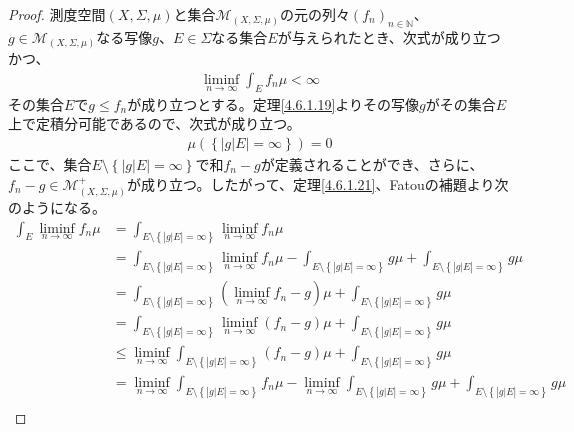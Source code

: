 \documentclass[dvipdfmx]{jsarticle}
\begin{document}
\begin{proof}
測度空間$(X,\varSigma,\mu)$と集合$\mathcal{M}_{(X,\varSigma,\mu)}$の元の列々$\left( f_{n} \right)_{n \in \mathbb{N}}$、$g \in \mathcal{M}_{(X,\varSigma,\mu)}$なる写像$g$、$E \in \varSigma$なる集合$E$が与えられたとき、次式が成り立つかつ、
\begin{align*}
\liminf_{n \rightarrow \infty}{\int_{E} {f_{n}\mu}} < \infty
\end{align*}
その集合$E$で$g \leq f_{n}$が成り立つとする。定理\ref{4.6.1.19}よりその写像$g$がその集合$E$上で定積分可能であるので、次式が成り立つ。
\begin{align*}
\mu\left( \left\{ \left| g|E \right| = \infty \right\} \right) = 0
\end{align*}
ここで、集合$E \setminus \left\{ \left| g|E \right| = \infty \right\}$で和$f_{n} - g$が定義されることができ、さらに、$f_{n} - g \in \mathcal{M}_{(X,\varSigma,\mu)}^{+}$が成り立つ。したがって、定理\ref{4.6.1.21}、Fatouの補題より次のようになる。
\begin{align*}
\int_{E} {\liminf_{n \rightarrow \infty}f_{n}\mu} &= \int_{E \setminus \left\{ \left| g|E \right| = \infty \right\}} {\liminf_{n \rightarrow \infty}f_{n}\mu}\\
&= \int_{E \setminus \left\{ \left| g|E \right| = \infty \right\}} {\liminf_{n \rightarrow \infty}f_{n}\mu} - \int_{E \setminus \left\{ \left| g|E \right| = \infty \right\}} {g\mu} + \int_{E \setminus \left\{ \left| g|E \right| = \infty \right\}} {g\mu}\\
&= \int_{E \setminus \left\{ \left| g|E \right| = \infty \right\}} {\left( \liminf_{n \rightarrow \infty}f_{n} - g \right)\mu} + \int_{E \setminus \left\{ \left| g|E \right| = \infty \right\}} {g\mu}\\
&= \int_{E \setminus \left\{ \left| g|E \right| = \infty \right\}} {\liminf_{n \rightarrow \infty}\left( f_{n} - g \right)\mu} + \int_{E \setminus \left\{ \left| g|E \right| = \infty \right\}} {g\mu}\\
&\leq \liminf_{n \rightarrow \infty}{\int_{E \setminus \left\{ \left| g|E \right| = \infty \right\}} {\left( f_{n} - g \right)\mu}} + \int_{E \setminus \left\{ \left| g|E \right| = \infty \right\}} {g\mu}\\
&= \liminf_{n \rightarrow \infty}{\int_{E \setminus \left\{ \left| g|E \right| = \infty \right\}} {f_{n}\mu}} - \liminf_{n \rightarrow \infty}{\int_{E \setminus \left\{ \left| g|E \right| = \infty \right\}} {g\mu}} + \int_{E \setminus \left\{ \left| g|E \right| = \infty \right\}} {g\mu}\\

\end{align*}
\end{proof}
\end{document}
